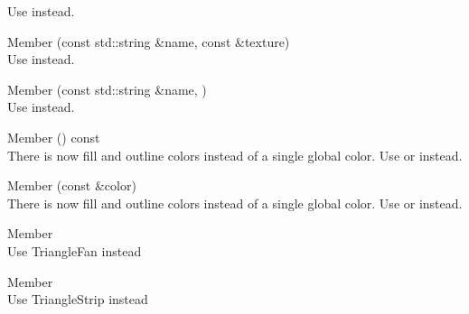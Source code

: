 \begin{DoxyRefList}
\label{deprecated__deprecated000013}%
%
Use  instead. 
\item[Member \doxylink{classsf_1_1_shader_a08c7cafd4f73ab898319c4fd7d8b5501}{sf\+::Shader\+::set\+Parameter} (const std\+::string \&name, const \doxylink{classsf_1_1_texture}{Texture} \&texture)]\hfill \\
\label{deprecated__deprecated000014}%
%
Use  instead. 
\item[Member \doxylink{classsf_1_1_shader_a0fa7ecad14206e4d5edae1d6aa87f553}{sf\+::Shader\+::set\+Parameter} (const std\+::string \&name, \doxylink{structsf_1_1_shader_1_1_current_texture_type}{Current\+Texture\+Type})]\hfill \\
\label{deprecated__deprecated000015}%
%
Use  instead. 
\item[Member \doxylink{classsf_1_1_text_a810cc4aa8eb5998f9eb9d02b1c099660}{sf\+::Text\+::get\+Color} () const]\hfill \\
\label{deprecated__deprecated000017}%
%
There is now fill and outline colors instead of a single global color. Use  or  instead. 
\item[Member \doxylink{classsf_1_1_text_a6ce65272d6d63ed01118366e92c68132}{sf\+::Text\+::set\+Color} (const \doxylink{classsf_1_1_color}{Color} \&color)]\hfill \\
\label{deprecated__deprecated000016}%
%
There is now fill and outline colors instead of a single global color. Use  or  instead. 
\item[Member \doxylink{group__graphics_gga5ee56ac1339984909610713096283b1ba5338a2c6d922151fe50f235036af8a20}{sf\+::Triangles\+Fan} ]\hfill \\
\label{deprecated__deprecated000003}%
%
Use Triangle\+Fan instead  
\item[Member \doxylink{group__graphics_gga5ee56ac1339984909610713096283b1ba66643dbbb24bbacb405973ed80eebae0}{sf\+::Triangles\+Strip} ]\hfill \\
\label{deprecated__deprecated000002}%
%
Use Triangle\+Strip instead 
\end{DoxyRefList}